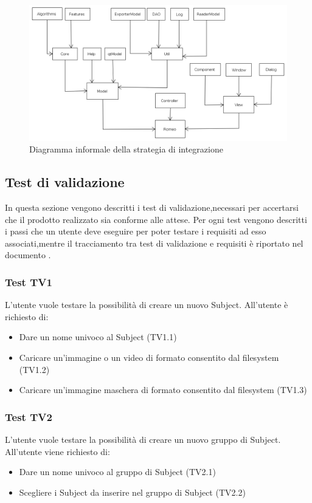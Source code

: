 \begin{figure}[!h]
		\centering
		\includegraphics[scale=0.5]{./img/Integrazione}
		\caption{Diagramma informale della strategia di integrazione}
	\end{figure}



\subsection{Test di validazione}
\label{testvalidazione}

In questa sezione vengono descritti i test di validazione,necessari per accertarsi che il prodotto realizzato sia conforme alle attese.
Per ogni test vengono descritti	i passi che un utente deve eseguire per poter testare i requisiti ad esso associati,mentre il tracciamento tra test di validazione e requisiti è
riportato nel documento \analisi{}.

\subsubsection{Test TV1}
\label{tv1}
L'utente vuole testare la possibilità di creare un nuovo Subject.
All'utente è richiesto di:
\begin{itemize}
\item Dare un nome univoco al Subject (TV1.1)
\item Caricare un'immagine o un video di formato consentito dal filesystem (TV1.2)
\item Caricare un'immagine maschera di formato consentito dal filesystem (TV1.3)
\end{itemize}

\subsubsection{Test TV2}
\label{tv2}
L'utente vuole testare la possibilità di creare un nuovo gruppo di Subject.
All'utente viene richiesto di:
\begin{itemize}
\item Dare un nome univoco al gruppo di Subject (TV2.1)
\item Scegliere i Subject da inserire nel gruppo di Subject (TV2.2)
\end{itemize}

